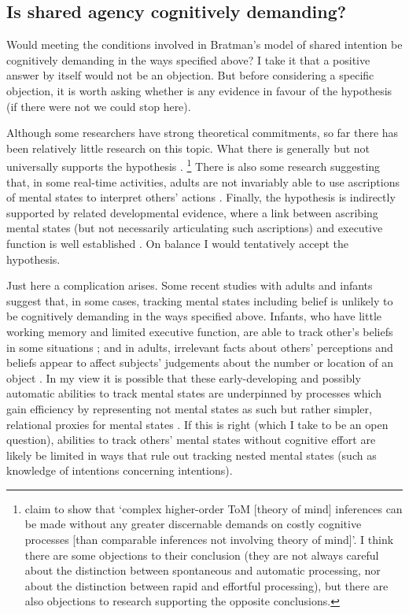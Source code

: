 \documentclass[12pt,letterpaper]{extarticle}
\begin{document}
\subsection{Is shared agency cognitively demanding?}
\label{sub_cog_demanding}
Would meeting the conditions involved in Bratman's model of shared intention be cognitively demanding in the ways specified above?
I take it that a positive answer by itself would not be an objection.
But before considering a specific objection, it is worth asking whether is any evidence in favour of the hypothesis (if there were not we could stop here).

Although some researchers have strong theoretical commitments, so far there has been relatively little research on this topic.
What there is generally but not universally supports the hypothesis \citep[e.g.][]{McKinnon:2007rr,Apperly:2008jv}.%
%
\footnote{
\citet[][p.\ 193]{ferguson_eye_2011} claim to show that `complex higher-order ToM [theory of mind] inferences can be made without any greater discernable demands on costly cognitive processes [than comparable inferences not involving theory of mind]'.
I think there are some objections to their conclusion (they are not always careful about the distinction between spontaneous and automatic processing, nor about the distinction between rapid and effortful processing), but there are also objections to research supporting the opposite conclusions.
}
%
There is also some research suggesting that, in some real-time activities, adults are not invariably able to use ascriptions of mental states to interpret others' actions \citep{Keysar:2003xu,apperly_why_2010}.
Finally, the hypothesis is indirectly supported by related developmental evidence, where a link between ascribing mental states (but not necessarily articulating such ascriptions) and executive function is well established \citep{Perner:1999yr}.
On balance I would tentatively accept the hypothesis.

Just here a complication arises.
Some recent studies with adults and infants suggest that, in some cases, tracking mental states including belief is unlikely to be cognitively demanding in the ways specified above.
Infants, who have little working memory and limited executive function, are able to track other's beliefs in some situations \citep{Onishi:2005hm,Baillargeon:gx,Southgate:2007js};
and in adults, irrelevant facts about others' perceptions and beliefs appear to affect subjects' judgements about the number or location of an object \citep{Samson:2010jm,kovacs_social_2010}.
In my view it is possible that these early-developing and possibly automatic abilities to track mental states are underpinned by processes which gain efficiency by representing not mental states as such but rather  simpler, relational proxies for mental states \citep{Apperly:2009ju,butterfill_minimal,surtees_direct_2011}.
If this is right (which I take to be an open question), abilities to track others' mental states without cognitive effort are likely be limited in ways that rule out tracking nested mental states (such as knowledge of intentions concerning intentions).
\end{document}
